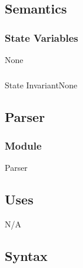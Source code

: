 \documentclass[12pt]{article}
\begin{document}
                \subsection* {Semantics}
                    \subsubsection* {State Variables} None
                    \subsubsection*{} {State Invariant}None
                
                \newpage
               
                 \newpage
                \subsection* {Parser}
                
                \subsubsection*{Module}
                
                Parser
                
                \subsection* {Uses}
                
                N/A
                
                \subsection* {Syntax}
\end{document}
